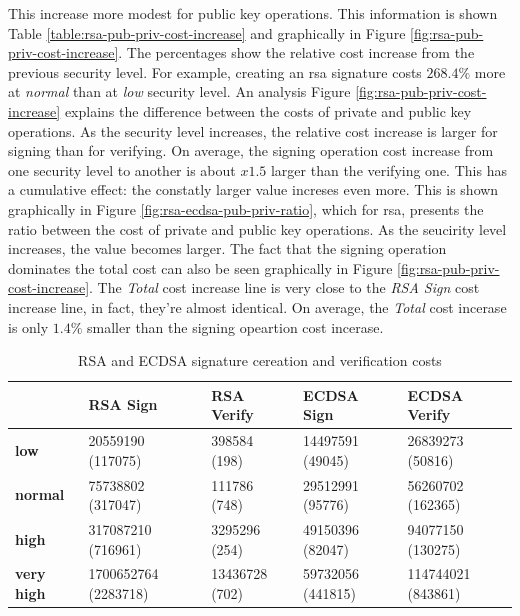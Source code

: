 \documentclass{llncs}
\begin{document}
This increase more modest for public key operations. This information is shown Table \ref{table:rsa-pub-priv-cost-increase} and graphically 
in Figure \ref{fig:rsa-pub-priv-cost-increase}. 
The percentages show the relative cost increase from the previous security level. For example, creating an \gls{rsa} signature costs 
$268.4\%$ more at \textit{normal} than at \textit{low} security level. An analysis Figure \ref{fig:rsa-pub-priv-cost-increase}
explains the difference between the costs of private and public key operations. As the security level increases, the relative cost
increase is larger for signing than for verifying. On average, the signing operation cost increase from one security level to another 
is about $x1.5$ larger than the verifying one. This has a cumulative effect: the constatly larger value increses even more. 
This is shown graphically in Figure \ref{fig:rsa-ecdsa-pub-priv-ratio}, which for \gls{rsa}, presents the ratio between the cost of private and 
public key operations. As the seucirity level increases, the value becomes larger. The fact that the signing operation dominates the total cost
can also be seen graphically in Figure \ref{fig:rsa-pub-priv-cost-increase}. The \textit{Total} cost increase line is very close to the 
\textit{RSA Sign} cost increase line, in fact, they're almost identical. On average, the \textit{Total} cost incerase is only $1.4\%$ smaller
than the signing opeartion cost incerase.

\begin{table}[]
  \begin{tabular}{|l|l|l|l|l|}
  \hline
                    & \textbf{RSA Sign}    & \textbf{RSA Verify} & \textbf{ECDSA Sign} & \textbf{ECDSA Verify} \\ \hline
  \textbf{low}       & 20559190 (117075)    & 398584 (198)        & 14497591 (49045)    & 26839273 (50816)      \\ \hline
  \textbf{normal}    & 75738802 (317047)    & 111786 (748)       & 29512991 (95776)    & 56260702 (162365)     \\ \hline
  \textbf{high}      & 317087210 (716961)   & 3295296 (254)       & 49150396 (82047)     & 94077150 (130275)     \\ \hline
  \textbf{very high} & 1700652764 (2283718) & 13436728 (702)      & 59732056 (441815)   & 114744021 (843861)    \\ \hline
  \end{tabular}
  \caption{\label{table:rsa-costs-all-sls} RSA and ECDSA signature cereation and verification costs} \end{table}
\end{document}
